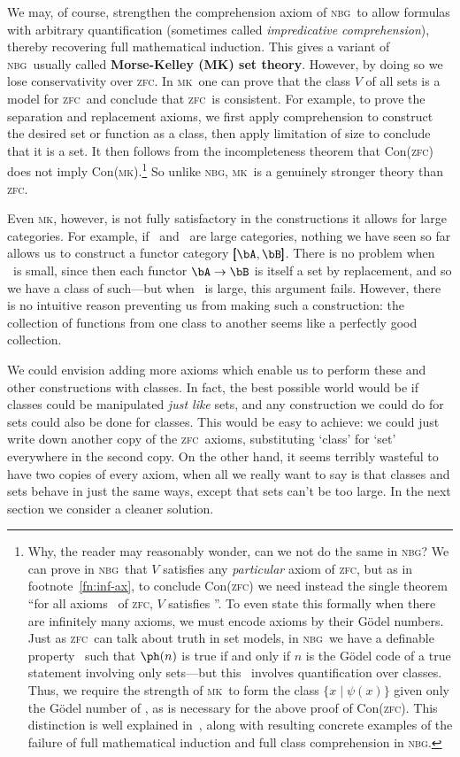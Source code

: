 \documentclass{amsart}
\def\zfc{\textsc{zfc}}
\def\nbg{\textsc{nbg}}
\def\mk{\textsc{mk}}
\begin{document}
We may, of course, strengthen the comprehension axiom of \nbg\ to
allow formulas with arbitrary quantification (sometimes called
\emph{impredicative comprehension}), thereby recovering full
mathematical induction.  This gives a variant of \nbg\ usually called
\textbf{Morse-Kelley (MK) set theory}.  However, by doing so we lose
conservativity over \zfc.  In \mk\ one can prove that the class $V$ of
all sets is a model for \zfc\ and conclude that \zfc\ is consistent.
For example, to prove the separation and replacement axioms, we first
apply comprehension to construct the desired set or function as a
class, then apply limitation of size to conclude that it is a set.  It
then follows from the incompleteness theorem that Con(\zfc) does not
imply Con(\mk).\footnote{Why, the reader may reasonably wonder, can we
  not do the same in \nbg?  We can prove in \nbg\ that $V$ satisfies
  any \emph{particular} axiom of \zfc, but as in
  footnote~\ref{fn:inf-ax}, to conclude Con(\zfc) we need instead the
  single theorem ``for all axioms \psi\ of \zfc, $V$ satisfies \psi''.
  To even state this formally when there are infinitely many axioms,
  we must encode axioms by their G\"odel numbers.  Just as \zfc\ can
  talk about truth in set models, in \nbg\ we have a definable
  property \ph\ such that $\ph(n)$ is true if and only if $n$ is the
  G\"odel code of a true statement involving only sets---but this \ph\
  involves quantification over classes.  Thus, we require the strength
  of \mk\ to form the class $\{x \mid \psi(x)\}$ given only the
  G\"odel number of \psi, as is necessary for the above proof of
  Con(\zfc).  This distinction is well explained
  in~\cite{mostowski:impred,mostowski:cor-impred}, along with
  resulting concrete examples of the failure of full mathematical
  induction and full class comprehension in \nbg.}  So unlike \nbg,
\mk\ is a genuinely stronger theory than \zfc.

Even \mk, however, is not fully satisfactory in the constructions it
allows for large categories.  For example, if \bA\ and \bB\ are large
categories, nothing we have seen so far allows us to construct a
functor category $\pmb[\bA,\bB\pmb]$.  There is no problem when \bA\
is small, since then each functor $\bA\to\bB$ is itself a set by
replacement, and so we have a class of such---but when \bA\ is large,
this argument fails.  However, there is no intuitive reason preventing
us from making such a construction: the collection of functions from
one class to another seems like a perfectly good collection.

We could envision adding more axioms which enable us to perform these
and other constructions with classes.  In fact, the best possible
world would be if classes could be manipulated \emph{just like} sets,
and any construction we could do for sets could also be done for
classes.  This would be easy to achieve: we could just write down
another copy of the \zfc\ axioms, substituting `class' for `set'
everywhere in the second copy.  On the other hand, it seems terribly
wasteful to have two copies of every axiom, when all we really want to
say is that classes and sets behave in just the same ways, except that
sets can't be too large.  In the next section we consider a cleaner
solution.
\end{document}
